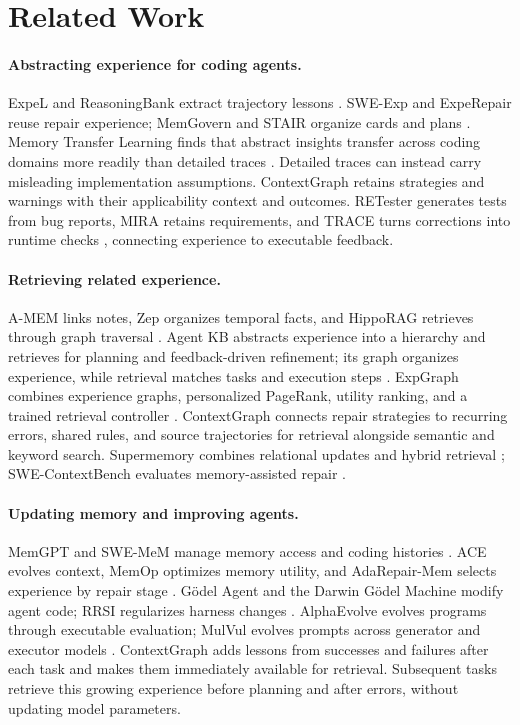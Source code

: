 \section{Related Work}
\label{sec:related-work}

\paragraph{Abstracting experience for coding agents.}
ExpeL and ReasoningBank extract trajectory lessons
\citep{expel2024,reasoningbank2026}. SWE-Exp and ExpeRepair reuse repair
experience; MemGovern and STAIR organize cards and plans
\citep{sweexp2025,experepair2026,memgovern2026,stair2026}.
Memory Transfer Learning finds that abstract insights transfer across coding
domains more readily than detailed traces \citep{transfer2026}.
Detailed traces can instead carry misleading implementation assumptions. ContextGraph
retains strategies and warnings with their applicability context and outcomes.
RETester generates tests from bug reports, MIRA retains requirements, and
TRACE turns corrections into runtime checks
\citep{retester2025,mira2026,trace2026}, connecting experience to executable feedback.

\paragraph{Retrieving related experience.}
A-MEM links notes, Zep organizes temporal facts, and HippoRAG retrieves through
graph traversal \citep{amem2025,zep2025,hipporag2024}. Agent KB abstracts
experience into a hierarchy and retrieves for
planning and feedback-driven refinement; its graph organizes experience,
while retrieval matches tasks and execution steps \citep{agentkb2025}.
ExpGraph combines experience graphs, personalized PageRank, utility ranking,
and a trained retrieval controller
\citep{expgraph2026}. ContextGraph connects repair strategies to recurring
errors, shared rules, and source trajectories for retrieval alongside
semantic and keyword search. Supermemory combines relational updates and
hybrid retrieval \citep{supermemoryreport2026}; SWE-ContextBench evaluates
memory-assisted repair \citep{swecontext2026}.

\paragraph{Updating memory and improving agents.}
MemGPT and SWE-MeM manage memory access and coding histories
\citep{memgpt2023,swemem2026}. ACE evolves context, MemOp optimizes memory
utility, and AdaRepair-Mem selects experience by repair stage
\citep{ace2026,memop2026,adarepairmem2026}.
G\"odel Agent and the Darwin G\"odel Machine modify agent code; RRSI
regularizes harness changes \citep{godelagent2025,dgm2026,rrsi2026}.
AlphaEvolve evolves programs through executable evaluation; MulVul evolves
prompts across generator and executor models \citep{alphaevolve2025,mulvul2026}.
ContextGraph adds lessons from successes and failures after each task and
makes them immediately available for retrieval.
Subsequent tasks retrieve this growing experience before planning and after
errors, without updating model parameters.
